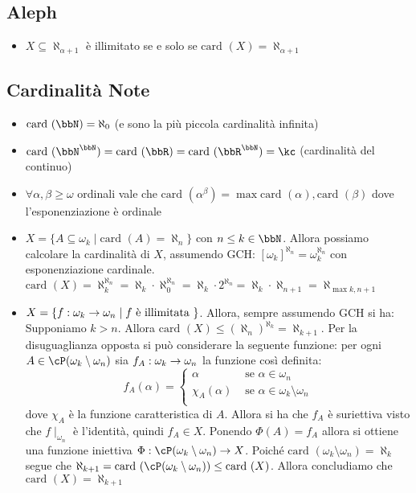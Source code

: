 \documentclass[a4paper,NoNotes,GeneralMath]{stdmdoc}
\newcommand{\card}[1]{\text{card }({#1})}
\begin{document}
	\subsection*{Aleph}
	\begin{itemize}
		\item $X \subseteq \aleph_{\alpha + 1}$ è illimitato se e solo se $\card{X} = \aleph_{\alpha + 1}$
	\end{itemize}
	
	\subsection*{Cardinalità Note}
	\begin{itemize}
		\item $\card{\bbN} = \aleph_0$ (e sono la più piccola cardinalità infinita)
		\item $\card{\bbN^\bbN} = \card{\bbR} = \card{\bbR^\bbN} = \kc$ (cardinalità del continuo)
		\item $\forall \alpha, \beta \ge \omega$ ordinali vale che $\card{\alpha^\beta} = \max{\card{\alpha}, \card{\beta}}$ dove l'esponenziazione è ordinale
		\item $X = \{ A \subseteq \omega_k \mid \card{A} = \aleph_n \}$ con $n \le k \in \bbN$. Allora possiamo calcolare la cardinalità di $X$, assumendo GCH: $[\omega_k]^{\aleph_n} = \omega_k ^ {\aleph_n}$ con esponenziazione cardinale. $ \card{X} = \aleph_k ^ {\aleph_n} = \aleph_k \cdot \aleph_0^{\aleph_n} = \aleph_k \cdot 2^{\aleph_n} = \aleph_k \cdot \aleph_{n + 1} = \aleph_{\max{k, n+1}}$
		\item $X = \{ f: \omega_k \rightarrow \omega_n \mid f \text{ è illimitata } \}$. Allora, sempre assumendo GCH si ha: Supponiamo $k > n$. Allora $\card{X} \le (\aleph_n)^{\aleph_k} = \aleph_{k + 1}$. Per la disuguaglianza opposta si può considerare la seguente funzione: per ogni $A \in \cP (\omega_k \setminus \omega_n)$ sia $f_A: \omega_k \rightarrow \omega_n$ la funzione così definita:
			$$ f_A(\alpha) = \left\{ \begin{array}{cc} \alpha & \text{ se } \alpha \in \omega_n \\ 
				\chi_A(\alpha) & \text{ se } \alpha \in \omega_k \setminus \omega_n \\ \end{array} \right.$$
			dove $\chi_A$ è la funzione caratteristica di $A$. Allora si ha che $f_A$ è suriettiva visto che $f\mid_{\omega_n}$ è l'identità, quindi $f_A \in X$. Ponendo $\Phi(A) = f_A$ allora si ottiene una funzione iniettiva $\Phi: \cP (\omega_k \setminus \omega_n) \rar X$. Poiché $\card{\omega_k \setminus \omega_n} = \aleph_k$ segue che $\aleph_{k + 1} = \card{\cP(\omega_k \setminus \omega_n)} \le \card{X}$. Allora concludiamo che $\card{X} = \aleph_{k + 1}$

\end{itemize}
\end{document}
